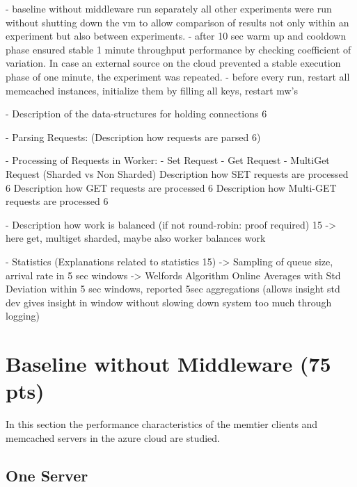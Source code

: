 \documentclass[11pt,a4paper]{article}
\begin{document}
- baseline without middleware run separately all other experiments were run without shutting down the vm to allow comparison of results not only within an experiment but also between experiments.
- after 10 sec warm up and cooldown phase ensured stable 1 minute throughput performance by checking coefficient of variation. In case an external source on the cloud prevented a stable execution phase of one minute, the experiment was repeated.
- before every run, restart all memcached instances, initialize them by filling all keys, restart mw's




- Description of the data-structures for holding connections 6 

- Parsing Requests: 
(Description how requests are parsed 6)

- Processing of Requests in Worker:
- Set Request
- Get Request
- MultiGet Request (Sharded vs Non Sharded)
Description how SET requests are processed 6 Description how GET requests are processed 6 Description how Multi-GET requests are processed 6 

- Description how work is balanced (if not round-robin: proof required) 15 
-> here get, multiget sharded, maybe also worker balances work

- Statistics (Explanations related to statistics 15)
-> Sampling of queue size, arrival rate in 5 sec windows
-> Welfords Algorithm Online Averages with Std Deviation within 5 sec windows, reported 5sec aggregations (allows insight std dev gives insight in window without slowing down system too much through logging)


\section{Baseline without Middleware (75 pts)}

In this section the performance characteristics of the memtier clients and memcached servers in the azure cloud are studied.

\subsection{One Server}

\end{document}
